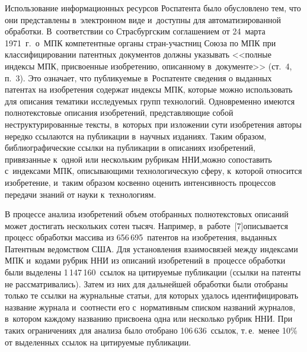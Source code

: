\begin{multicols}{2}
  Использование информационных ресурсов Роспатента было обусловлено тем, что они
пред\-став\-ле\-ны в~электронном виде и~доступны для автоматизированной обработки.
В~соответствии со Страсбургским соглашением от 24~марта 1971~г.\ о~МПК компетентные
органы стран-участ\-ниц Союза по МПК при классифицировании патентных документов
должны указывать <<полные индексы МПК, присвоенные изобретению,
описанному в~документе>> (ст.~4, п.~3). Это означает, что публикуемые в~Роспатенте сведения о
выданных патентах на изобретения содержат индексы МПК, которые можно использовать
для описания тематики исследуемых групп технологий. Одновременно имеются
полнотекстовые описания изобретений, представляющие собой неструктурированные
текс\-ты, в~которых при изложении сути изобретения авторы нередко ссылаются на
публикации в~научных изданиях. Таким образом, библиографические ссылки на публикации
в описаниях изобретений, привязанные к~одной или нескольким рубрикам
ННИ,\linebreak можно сопоставить с~индексами МПК, описыва\-ющи\-ми
технологическую сферу, к~которой относится изобретение, и~таким образом косвенно
оценить интенсивность процессов передачи знаний от науки к~тех\-но\-ло\-гиям.
{ %

}

  В процессе анализа изобретений объем отобранных полнотекстовых описаний может
достигать несколь\-ких сотен тысяч. Например, в~работе~[7]\linebreak описывается процесс обработки
массива из 656\,695~патентов на изобретения, выданных Патентным ведомством США. Для
установления взаимосвязей между индексами МПК и~кодами рубрик ННИ
 из описаний изобретений в~процессе обработки были выделены
1\,147\,160~ссылок на цитируемые публикации (ссылки на патенты не рассматривались).
Затем из них для дальнейшей обработки были отобраны только те ссылки на журнальные
статьи, для которых удалось идентифицировать название журнала и~соотнести его с~нормативным списком названий журналов, в~котором каждому названию присвоена одна или
несколько рубрик ННИ. При таких ограничениях для анализа
было отобрано 106\,636~ссылок, т.\,е.\ менее 10\% от выделенных ссылок на цитируемые
публикации.


\end{multicols}
